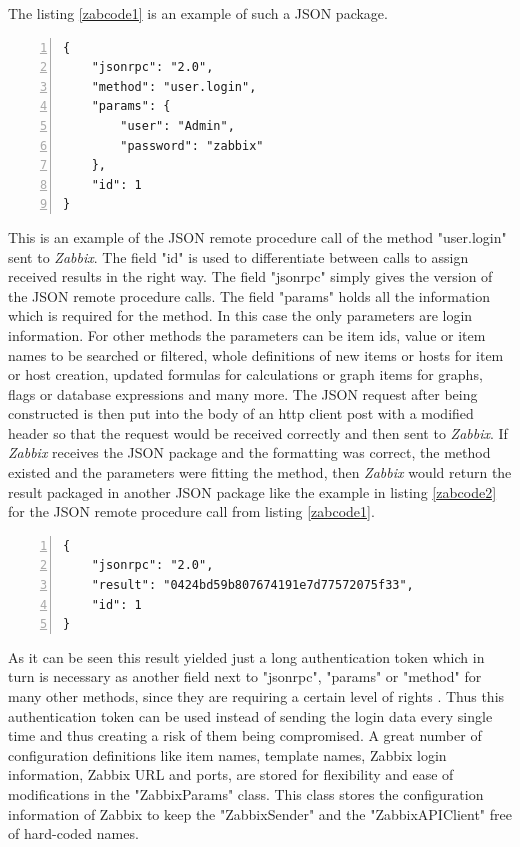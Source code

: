 The listing \ref{zabcode1} is an example of such a JSON package.
\begin{lstlisting}[language=json_sw,caption={JSON authentication request\cite{zab3}},captionpos=b,numbers=left,label=zabcode1]
{
    "jsonrpc": "2.0",
    "method": "user.login",
    "params": {
        "user": "Admin",
        "password": "zabbix"
    },
    "id": 1
}\end{lstlisting} 
	This is an example of the JSON remote procedure call of the method "user.login" sent to \textit{Zabbix}. The field "id" is used to differentiate between calls to assign received results in the right way. The field "jsonrpc" simply gives the version of the JSON remote procedure calls. The field "params" holds all the information which is required for the method. In this case the only parameters are login information. For other methods the parameters can be item ids, value or item names to be searched or filtered, whole definitions of new items or hosts for item or host creation, updated formulas for calculations or graph items for graphs, flags or database expressions and many more. The JSON request after being constructed is then put into the body of an http client post with a modified header so that the request would be received correctly and then sent to \textit{Zabbix}. If \textit{Zabbix} receives the JSON package and the formatting was correct, the method existed and the parameters were fitting the method, then \textit{Zabbix} would return the result packaged in another JSON package like the example in listing \ref{zabcode2} for the JSON remote procedure call from listing \ref{zabcode1}.
	\begin{lstlisting}[language=json_sw,caption={JSON authentication response\cite{zab3}},captionpos=b,numbers=left,label=zabcode2]
{
    "jsonrpc": "2.0",
    "result": "0424bd59b807674191e7d77572075f33",
    "id": 1
}
\end{lstlisting}
	As it can be seen this result yielded just a long authentication token which in turn is necessary as another field next to "jsonrpc", "params" or "method" for many other methods, since they are requiring a certain level of rights \cite{zab3}. Thus this authentication token can be used instead of sending the login data every single time and thus creating a risk of them being compromised.
	A great number of configuration definitions like item names, template names, Zabbix login information, Zabbix URL and ports, are stored for flexibility and ease of modifications in the "ZabbixParams" class. This class stores the configuration information of Zabbix to keep the "ZabbixSender" and the "ZabbixAPIClient" free of hard-coded names.
